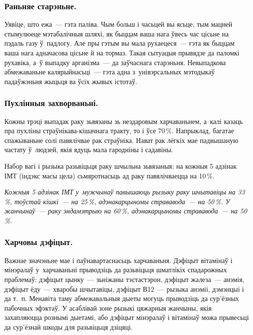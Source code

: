 
\subsubsection{Раньняе старэньне.} 
Уявіце, што ежа~--- гэта паліва. Чым больш і часьцей вы ясьце, тым мацней стымулюеце мэтабалічныя шляхі, як быццам ваша нага ўвесь час цісьне на пэдаль газу ў~падлогу. Але пры гэтым вы мала рухаецеся~--- гэта як быццам ваша нага адначасова цісьне й на тормаз. Такая сытуацыя прывядзе да паломкі рухавіка, а~ў выпадку арганізма~--- да заўчаснага старэньня. Невыпадкова абмежаваньне калярыйнасьці~--- гэта адна з~унівэрсальных мэтодыкаў падаўжэньня жыцьця ва ўсіх жывых істотаў.

\subsubsection{Пухлінныя захворваньні.} 
Кожны трэці выпадак раку зьвязаны зь нездаровым харчаваньнем, а~калі казаць пра пухліны страўнікава-кішачнага тракту, то і ўсе 70\,\%. Напрыклад, багатае спажываньне солі павялічвае рак страўніка. Нават рак лёгкіх мае падвышаную частату ў~людзей, якія ядуць мала гародніны і садавіны.

Набор вагі і рызыка разьвіцьця раку шчыльна зьвязаныя: на кожныя 5 адзінак ІМТ (індэкс масы цела) сьмяротнасьць ад раку павялічваецца на 10\,\%. 

\emph{Кожныя 5 адзінак ІМТ у~мужчынаў павышаюць рызыку раку шчытавіцы на 33\,\%, тоўстай кішкі~--- на 25\,\%, адэнакарцыномы стрававода~--- на 50\,\%. У жанчынаў~--- раку эндамэтрыю на 60\,\%, адэнакарцыномы стрававода~--- на 50\,\%.}

\subsubsection{Харчовы дэфіцыт.} 

Важнае значэньне мае і паўнавартаснасьць харчаваньня. Дэфіцыт вітамінаў і мінэралаў у~харчаваньні прыводзіць да разьвіцьця шматлікіх спадарожных праблемаў: дэфіцыт цынку~--- зьніжаны тэстастэрон, дэфіцыт жалеза~--- анэмія, дэфіцыт ёду~--- хваробы шчытавіцы, дэфіцыт В12~--- рызыка анэміі, дэмэнцыі і да т.~п. Менавіта таму абмежавальныя дыеты могуць прыводзіць да сур'ёзных пабочных эфэктаў. У асаблівай зоне рызыкі цяжарныя жанчыны, якія захапляюцца рознымі дыетамі, або дэфіцыт мінэралаў і вітамінаў можа прывесьці да сур'ёзнай шкоды для разьвіцьця дзіцяці.

